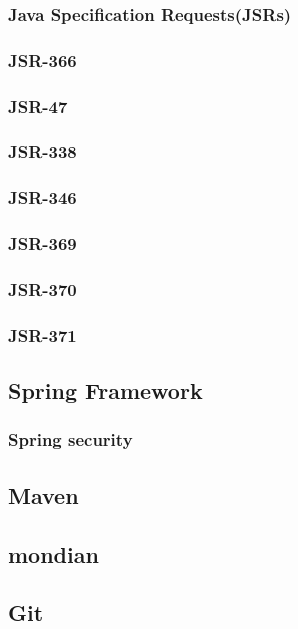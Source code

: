 		\subsubsection{Java Specification Requests(JSRs)}
		\subsubsection{JSR-366}
		\subsubsection{JSR-47}
		\subsubsection{JSR-338}
		\subsubsection{JSR-346}
		\subsubsection{JSR-369}
		\subsubsection{JSR-370}
		\subsubsection{JSR-371}
	\subsection{Spring Framework}
		\subsubsection{Spring security}
	\subsection{Maven}
	\subsection{mondian}
	\subsection{Git}


		
		
		
		
